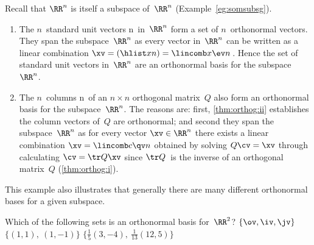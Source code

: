 \begin{example} \label{eg:}
Recall that \(\RR^n\) is itself a subspace of~\(\RR^n\) (Example~\ref{eg:somsubsg}).
\begin{enumerate}
\item The \(n\)~standard unit vectors \hlist\ev n\ in~\(\RR^n\) form a set of \(n\)~orthonormal vectors.
They span the subspace~\(\RR^n\) as every vector in~\(\RR^n\) can be written as a linear combination \(\xv=(\hlist xn)=\lincomb x\ev n\)\,.
Hence the set of standard unit vectors in~\(\RR^n\) are an orthonormal basis for the subspace~\(\RR^n\).

\item The \(n\)~columns \hlist\qv n\ of an \(n\times n\) orthogonal matrix~\(Q\) also form an orthonormal basis for the subspace~\(\RR^n\).
The reasons are: first, \autoref{thm:orthog:ii} establishes the column vectors of~\(Q\) are orthonormal; and second they span the subspace~\(\RR^n\) as for every vector \(\xv\in\RR^n\) there exists a linear combination \(\xv=\lincomb c\qv n\) obtained by solving \(Q\cv=\xv\) through calculating \(\cv=\tr Q\xv\) since \(\tr Q\)~is the inverse of an orthogonal matrix~\(Q\) (\autoref{thm:orthog:i}).
\end{enumerate}
This example also illustrates that generally there are many different orthonormal bases for a given subspace.
\end{example}



\begin{activity}
Which of the following sets is an orthonormal basis for~\(\RR^2\)?
{\(\{\ov,\iv,\jv\}\)}
{\(\{(1,1),\ (1,-1)\}\)}
{\(\{\frac15(3,-4),\ \frac1{13}(12,5)\}\)}
\end{activity}




